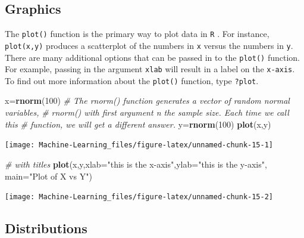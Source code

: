 \documentclass[]{book}
\newenvironment{Shaded}{\begin{snugshade}}{\end{snugshade}}
\newcommand{\KeywordTok}[1]{\textcolor[rgb]{0.13,0.29,0.53}{\textbf{#1}}}
\newcommand{\DataTypeTok}[1]{\textcolor[rgb]{0.13,0.29,0.53}{#1}}
\newcommand{\DecValTok}[1]{\textcolor[rgb]{0.00,0.00,0.81}{#1}}
\newcommand{\StringTok}[1]{\textcolor[rgb]{0.31,0.60,0.02}{#1}}
\newcommand{\CommentTok}[1]{\textcolor[rgb]{0.56,0.35,0.01}{\textit{#1}}}
\newcommand{\NormalTok}[1]{#1}
\begin{document}
\subsection{Graphics}\label{graphics}

The \texttt{plot()} function is the primary way to plot data in
\texttt{R} . For instance, \texttt{plot(x,y)} produces a scatterplot of
the numbers in \texttt{x} versus the numbers in \texttt{y}. There are
many additional options that can be passed in to the \texttt{plot()}
function. For example, passing in the argument \texttt{xlab} will result
in a label on the \texttt{x-axis}. To find out more information about
the \texttt{plot()} function, type \texttt{?plot}.

\begin{Shaded}
\begin{Highlighting}[]
\NormalTok{x=}\KeywordTok{rnorm}\NormalTok{(}\DecValTok{100}\NormalTok{)}
\CommentTok{# The rnorm() function generates a vector of random normal variables,}
\CommentTok{# rnorm() with first argument n the sample size. Each time we call this}
\CommentTok{# function, we will get a different answer.}
\NormalTok{y=}\KeywordTok{rnorm}\NormalTok{(}\DecValTok{100}\NormalTok{)}
\KeywordTok{plot}\NormalTok{(x,y)}
\end{Highlighting}
\end{Shaded}

\begin{center}\texttt{[image: Machine-Learning\_files/figure-latex/unnamed-chunk-15-1]} \end{center}

\begin{Shaded}
\begin{Highlighting}[]

\CommentTok{# with titles}
\KeywordTok{plot}\NormalTok{(x,y,}\DataTypeTok{xlab=}\StringTok{"this is the x-axis"}\NormalTok{,}\DataTypeTok{ylab=}\StringTok{"this is the y-axis"}\NormalTok{,}
\DataTypeTok{main=}\StringTok{"Plot of X vs Y"}\NormalTok{)}
\end{Highlighting}
\end{Shaded}

\begin{center}\texttt{[image: Machine-Learning\_files/figure-latex/unnamed-chunk-15-2]} \end{center}

\subsection{Distributions}\label{distributions}
\end{document}
